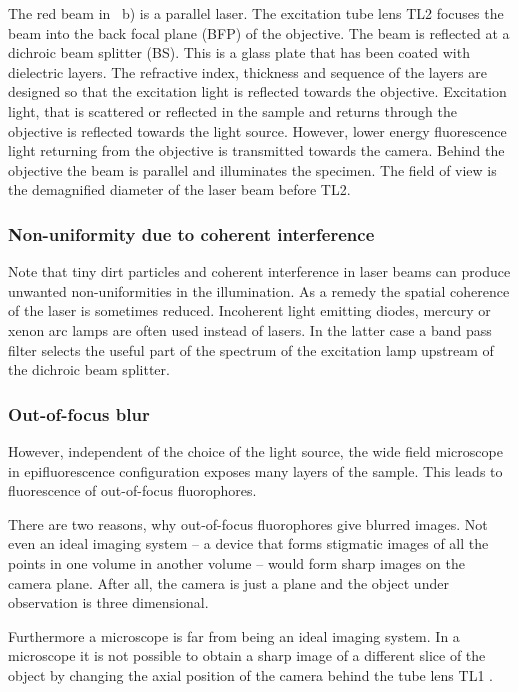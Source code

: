 
The red beam in ~b) is a parallel
laser. The excitation tube lens TL2 focuses the beam into the back
focal plane (BFP) of the objective. The beam is reflected at a
dichroic beam splitter (BS). This is a glass plate that has been
coated with dielectric layers. The refractive index, thickness and
sequence of the layers are designed so that the excitation light is
reflected towards the objective. Excitation light, that is scattered
or reflected in the sample and returns through the objective is
reflected towards the light source. However, lower energy fluorescence
light returning from the objective is transmitted towards the
camera. Behind the objective the beam is parallel and illuminates the
specimen. The field of view is the demagnified diameter of the laser
beam before TL2.
\subsubsection*{Non-uniformity due to coherent interference}
Note that tiny dirt particles and coherent interference in laser beams
can produce unwanted non-uniformities in the illumination. As a remedy
the spatial coherence of the laser is sometimes reduced.  Incoherent
light emitting diodes, mercury or xenon arc lamps are often used
instead of lasers. In the latter case a band pass filter selects the
useful part of the spectrum of the excitation lamp upstream of the
dichroic beam splitter.

\subsubsection{Out-of-focus blur}
However, independent of the choice of the light source, the wide field
microscope in epifluorescence configuration exposes many layers of the
sample. This leads to fluorescence of out-of-focus fluorophores.

There are two reasons, why out-of-focus fluorophores give blurred
images. Not even an ideal imaging system -- a device that forms
stigmatic images of all the points in one volume in another volume --
would form sharp images on the camera plane. After all, the camera is
just a plane and the object under observation is three dimensional.

Furthermore a microscope is far from being an ideal imaging system. In
a microscope it is not possible to obtain a sharp image of a different
slice of the object by changing the axial position of the camera
behind the tube lens TL1 \citep{Botcherby2007,Botcherby2008a}.
